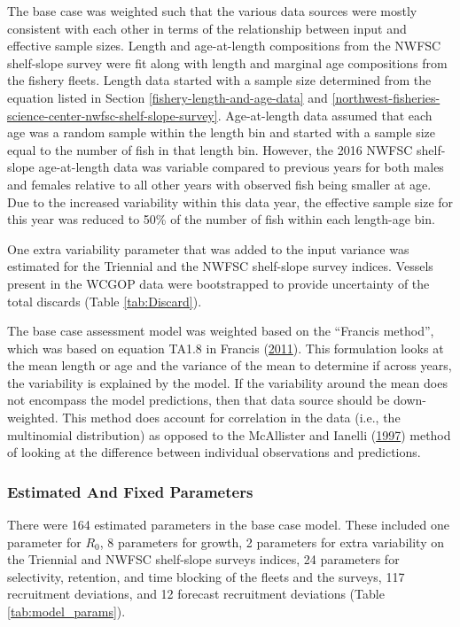 \documentclass[12pt,]{article}
\begin{document}
The base case was weighted such that the various data sources were
mostly consistent with each other in terms of the relationship between
input and effective sample sizes. Length and age-at-length compositions
from the NWFSC shelf-slope survey were fit along with length and
marginal age compositions from the fishery fleets. Length data started
with a sample size determined from the equation listed in Section
\ref{fishery-length-and-age-data} and
\ref{northwest-fisheries-science-center-nwfsc-shelf-slope-survey}.
Age-at-length data assumed that each age was a random sample within the
length bin and started with a sample size equal to the number of fish in
that length bin. However, the 2016 NWFSC shelf-slope age-at-length data
was variable compared to previous years for both males and females
relative to all other years with observed fish being smaller at age. Due
to the increased variability within this data year, the effective sample
size for this year was reduced to 50\% of the number of fish within each
length-age bin.

One extra variability parameter that was added to the input variance was
estimated for the Triennial and the NWFSC shelf-slope survey indices.
Vessels present in the WCGOP data were bootstrapped to provide
uncertainty of the total discards (Table \ref{tab:Discard}).

The base case assessment model was weighted based on the ``Francis
method'', which was based on equation TA1.8 in Francis
(\protect\hyperlink{ref-francis_data_2011}{2011}). This formulation
looks at the mean length or age and the variance of the mean to
determine if across years, the variability is explained by the model. If
the variability around the mean does not encompass the model
predictions, then that data source should be down-weighted. This method
does account for correlation in the data (i.e., the multinomial
distribution) as opposed to the McAllister and Ianelli
(\protect\hyperlink{ref-mcallister_bayesian_1997}{1997}) method of
looking at the difference between individual observations and
predictions.

\subsubsection{Estimated And Fixed
Parameters}\label{estimated-and-fixed-parameters}

There were 164 estimated parameters in the base case model. These
included one parameter for \(R_0\), 8 parameters for growth, 2
parameters for extra variability on the Triennial and NWFSC shelf-slope
surveys indices, 24 parameters for selectivity, retention, and time
blocking of the fleets and the surveys, 117 recruitment deviations, and
12 forecast recruitment deviations (Table \ref{tab:model_params}).
\end{document}
